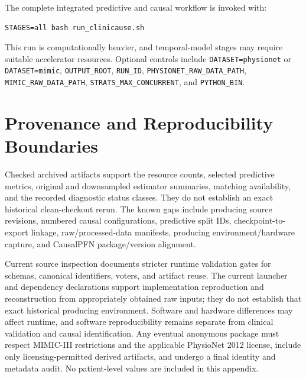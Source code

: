 \documentclass[letterpaper,10pt]{article}
\begin{document}
The complete integrated predictive and causal workflow is invoked with:

\begin{verbatim}
STAGES=all bash run_clinicause.sh
\end{verbatim}

This run is computationally heavier, and temporal-model stages may require
suitable accelerator resources. Optional controls include
\texttt{DATASET=physionet} or \texttt{DATASET=mimic},
\texttt{OUTPUT\_ROOT}, \texttt{RUN\_ID},
\texttt{PHYSIONET\_RAW\_DATA\_PATH}, \texttt{MIMIC\_RAW\_DATA\_PATH},
\texttt{STRATS\_MAX\_CONCURRENT}, and \texttt{PYTHON\_BIN}.

\section{Provenance and Reproducibility Boundaries}

Checked archived artifacts support the resource counts, selected predictive
metrics, original and downsampled estimator summaries, matching availability,
and the recorded diagnostic status classes.  They do not establish an exact
historical clean-checkout rerun.  The known gaps include producing source
revisions, numbered causal configurations, predictive split IDs,
checkpoint-to-export linkage, raw/processed-data manifests, producing
environment/hardware capture, and CausalPFN package/version alignment.

Current source inspection documents stricter runtime validation gates for
schemas, canonical identifiers, voters, and artifact reuse. The current
launcher and dependency declarations support implementation reproduction and
reconstruction from appropriately obtained raw inputs; they do not establish
that exact historical producing environment. Software and hardware differences
may affect runtime, and software reproducibility remains separate from clinical
validation and causal identification. Any eventual anonymous package must
respect MIMIC-III restrictions and the applicable PhysioNet 2012 license,
include only licensing-permitted derived artifacts, and undergo a final identity
and metadata audit. No patient-level values are included in this appendix.
\end{document}
